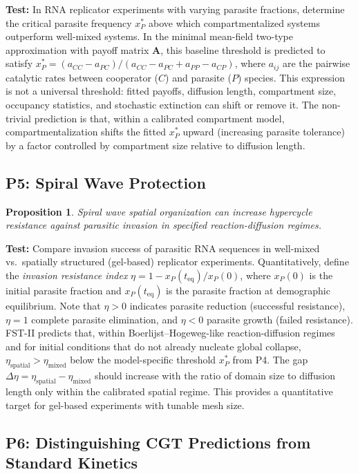 \documentclass[12pt,a4paper]{article}
\newtheorem{proposition}{Proposition}
\theoremstyle{remark}
\begin{document}
\textbf{Test:} In RNA replicator experiments with varying parasite fractions, determine the critical parasite frequency $x_P^*$ above which compartmentalized systems outperform well-mixed systems. In the minimal mean-field two-type approximation with payoff matrix $\mathbf{A}$, this baseline threshold is predicted to satisfy $x_P^* = (a_{CC} - a_{PC})/(a_{CC} - a_{PC} + a_{PP} - a_{CP})$, where $a_{ij}$ are the pairwise catalytic rates between cooperator ($C$) and parasite ($P$) species. This expression is not a universal threshold: fitted payoffs, diffusion length, compartment size, occupancy statistics, and stochastic extinction can shift or remove it. The non-trivial prediction is that, within a calibrated compartment model, compartmentalization shifts the fitted $x_P^*$ upward (increasing parasite tolerance) by a factor controlled by compartment size relative to diffusion length.

\subsection{P5: Spiral Wave Protection}

\begin{proposition}
Spiral wave spatial organization can increase hypercycle resistance against parasitic invasion in specified reaction-diffusion regimes.
\end{proposition}

\textbf{Test:} Compare invasion success of parasitic RNA sequences in well-mixed vs.\ spatially structured (gel-based) replicator experiments. Quantitatively, define the \emph{invasion resistance index} $\eta = 1 - x_P(t_{\mathrm{eq}})/x_P(0)$, where $x_P(0)$ is the initial parasite fraction and $x_P(t_{\mathrm{eq}})$ is the parasite fraction at demographic equilibrium. Note that $\eta > 0$ indicates parasite reduction (successful resistance), $\eta = 1$ complete parasite elimination, and $\eta < 0$ parasite growth (failed resistance). FST-II predicts that, within Boerlijst--Hogeweg-like reaction-diffusion regimes and for initial conditions that do not already nucleate global collapse, $\eta_{\mathrm{spatial}} > \eta_{\mathrm{mixed}}$ below the model-specific threshold $x_P^*$ from P4. The gap $\Delta\eta = \eta_{\mathrm{spatial}} - \eta_{\mathrm{mixed}}$ should increase with the ratio of domain size to diffusion length only within the calibrated spatial regime. This provides a quantitative target for gel-based experiments with tunable mesh size.

\subsection{P6: Distinguishing CGT Predictions from Standard Kinetics}
\end{document}
